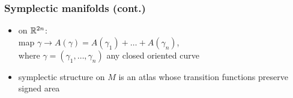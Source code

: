 \begin{frame}
  \frametitle{Symplectic manifolds (cont.)}
  \begin{itemize}
    \item {} on $\mathbb{R}^{2n}$:\\
    map $\gamma\to A(\gamma)=A(\gamma_1)+\dots+A(\gamma_n)$,\\
    where $\gamma=(\gamma_1,\dots,\gamma_n)$ any closed oriented curve
    \item symplectic structure on $M$ is an atlas whose transition functions preserve signed area
  \end{itemize}
\end{frame}
